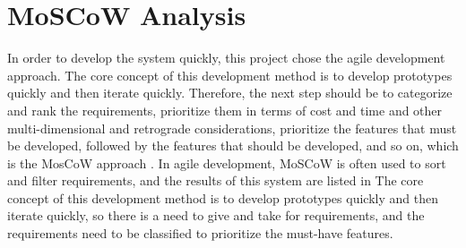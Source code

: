\section{MoSCoW Analysis}
In order to develop the system quickly, this project chose the agile development approach. The core concept of this development method is to develop prototypes quickly and then iterate quickly\cite{agile}. Therefore, the next step should be to categorize and rank the requirements, prioritize them in terms of cost and time and other multi-dimensional and retrograde considerations, prioritize the features that must be developed, followed by the features that should be developed, and so on, which is the MosCoW approach \cite{moscow}. In agile development, MoSCoW is often used to sort and filter requirements, and the results of this system are listed in 
The core concept of this development method is to develop prototypes quickly and then iterate quickly, so there is a need to give and take for requirements, and the requirements need to be classified to prioritize the must-have features.
